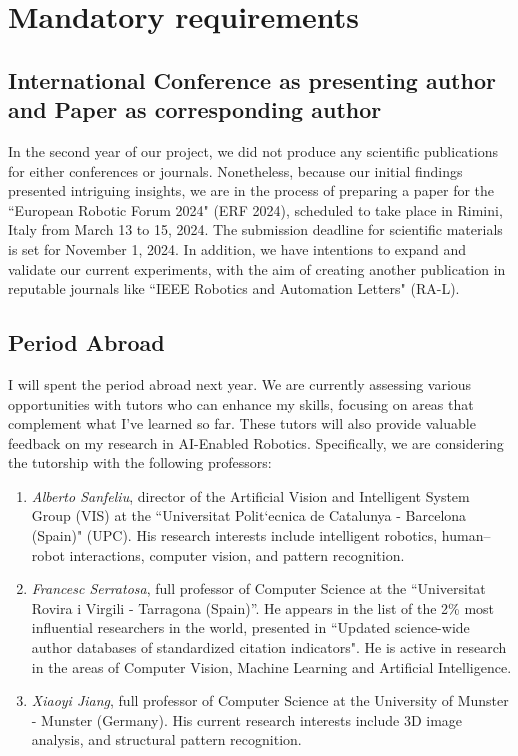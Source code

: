 \section{Mandatory requirements}

\subsection{International Conference as presenting author and Paper as corresponding author}
In the second year of our project, we did not produce any scientific publications for either conferences or journals. Nonetheless, because our initial findings presented intriguing insights, we are in the process of preparing a paper for the ``European Robotic Forum 2024" (ERF 2024), scheduled to take place in Rimini, Italy from March 13 to 15, 2024. The submission deadline for scientific materials is set for November 1, 2024.
In addition, we have intentions to expand and validate our current experiments, with the aim of creating another publication in reputable journals like ``IEEE Robotics and Automation Letters" (RA-L).

\subsection{Period Abroad}
I will spent the period abroad next year. We are currently assessing various opportunities with tutors who can enhance my skills, focusing on areas that complement what I've learned so far. These tutors will also provide valuable feedback on my research in AI-Enabled Robotics. Specifically, we are considering the tutorship with the following professors:
\begin{enumerate}
    \item \textit{Alberto Sanfeliu}, director of the Artificial Vision and Intelligent System Group (VIS) at the ``Universitat Polit`ecnica de Catalunya - Barcelona (Spain)" (UPC).  His research interests include intelligent robotics, human–robot interactions, computer vision, and pattern recognition.
    \item \textit{Francesc Serratosa}, full professor of Computer Science at the ``Universitat Rovira i Virgili - Tarragona (Spain)''. He appears in the list of the 2\% most influential researchers in the world, presented in ``Updated science-wide author databases of standardized citation indicators"\cite{}. He is active in research in the areas of Computer Vision, Machine Learning and Artificial Intelligence.
    \item \textit{Xiaoyi Jiang}, full professor of Computer Science at the University of Munster - Munster (Germany). His current research interests include 3D image analysis, and structural pattern recognition.
\end{enumerate}